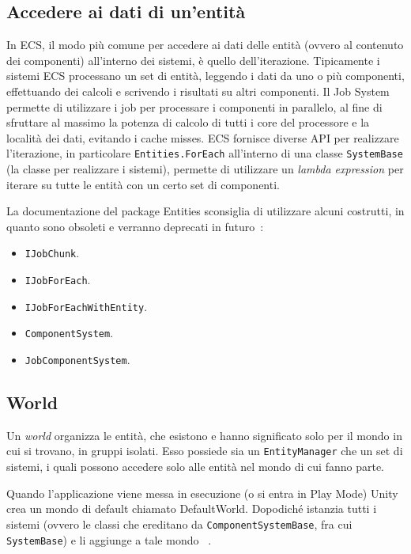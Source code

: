 \subsection{Accedere ai dati di un'entità}
In ECS, il modo più comune per accedere ai dati delle entità (ovvero al contenuto dei componenti) all'interno dei sistemi, è quello dell'iterazione. Tipicamente i sistemi ECS processano un set di entità, leggendo i dati da uno o più componenti, effettuando dei calcoli e scrivendo i risultati su altri componenti.
Il \Csh{} Job System permette di utilizzare i job per processare i componenti in parallelo, al fine di sfruttare al massimo la potenza di calcolo di tutti i core del processore e la località dei dati, evitando i cache misses.
ECS fornisce diverse API per realizzare l'iterazione, in particolare \verb|Entities.ForEach| all'interno di una classe \verb|SystemBase| (la classe per realizzare i sistemi), permette di utilizzare un \emph{lambda expression} per iterare su tutte le entità con un certo set di componenti.

La documentazione del package Entities sconsiglia di utilizzare alcuni costrutti, in quanto sono obsoleti e verranno deprecati in futuro~\cite{doc:unity-entities-manual}:
\begin{itemize}
    \item \verb|IJobChunk|.
    \item \verb|IJobForEach|.
    \item \verb|IJobForEachWithEntity|.
    \item \verb|ComponentSystem|.
    \item \verb|JobComponentSystem|.
\end{itemize}

\subsection{World}
Un \emph{world} organizza le entità, che esistono e hanno significato solo per il mondo in cui si trovano, in gruppi isolati. Esso possiede sia un \verb|EntityManager| che un set di sistemi, i quali possono accedere solo alle entità nel mondo di cui fanno parte.

Quando l'applicazione viene messa in esecuzione (o si entra in Play Mode) Unity crea un mondo di default chiamato DefaultWorld. Dopodiché istanzia tutti i sistemi (ovvero le classi che ereditano da \verb|ComponentSystemBase|, fra cui \verb|SystemBase|) e li aggiunge a tale mondo ~\cite{doc:unity-entities-manual}.

